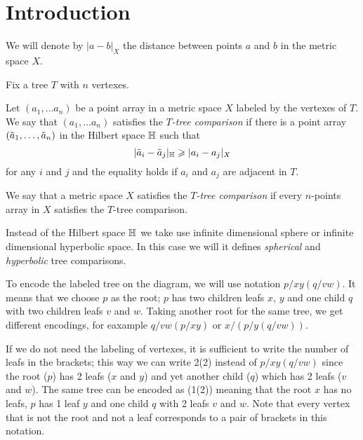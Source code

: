 \section{Introduction}\label{sec:intro}

We will denote by $|a-b|_X$ the distance between points $a$ and $b$ in the metric space $X$.

Fix a tree $T$ with $n$ vertexes.

Let $(a_1,\dots a_n)$ be a point array in a metric space $X$ labeled by the vertexes of $T$.
We say that $(a_1,\dots a_n)$  satisfies the \emph{$T$-tree comparison} if there is a point array $(\~a_1,\dots, \~a_n)$ in the Hilbert space $\HH$ such that 
\[|\~a_i-\~a_j|_\HH\ge|a_i-a_j|_X\]
for any $i$ and $j$ and the equality holds if $a_i$ and $a_j$ are adjacent in $T$.

We say that a metric space $X$ satisfies the \emph{$T$-tree comparison} if 
every $n$-points array in $X$ satisfies the $T$-tree comparison.

Instead of the Hilbert space $\HH$ we take use infinite dimensional sphere or infinite dimensional hyperbolic space.
In this case we will it defines \emph{spherical} and \emph{hyperbolic} tree comparisons.

\begin{wrapfigure}{r}{27 mm}
\vskip-8mm
\end{wrapfigure}

To encode the labeled tree on the diagram, we will use notation $p/xy(q/vw)$.
It means that we choose $p$ as the root; 
$p$ has two children leafs $x$, $y$ and one child $q$ with two children leafs $v$ and $w$.
Taking another root for the same tree, we get different encodings, for eaxample $q/vw(p/xy)$ or $x/(p/y(q/vw))$.

If we do not need the labeling of vertexes,
it is sufficient to write the number of leafs in the brackets;
this way we can write 2(2) instead of $p/xy(q/vw)$ since the root ($p$) has 2 leafs ($x$ and $y$) and yet another child ($q$) which has 2 leafs ($v$ and $w$).  
The same tree can be encoded as (1(2)) meaning that the root $x$ has no leafs, 
$p$ has 1 leaf $y$ and one child $q$ with 2 leafs $v$ and $w$.
Note that every vertex that is not the root and not a leaf corresponds to a pair of brackets in this notation.

